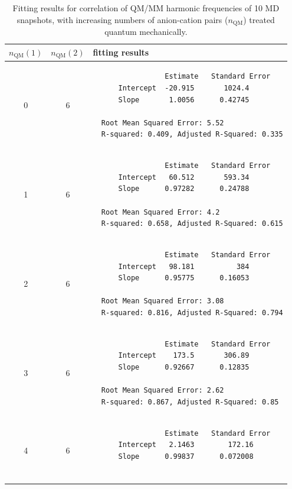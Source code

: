 \begin{table}
  \centering
  \caption[Fit procedure results for DVR convergence]{Fitting results for correlation of QM/MM harmonic frequencies of \num{10} MD snapshots, with increasing numbers of anion-cation pairs (\(n_{\text{QM}}\)) treated quantum mechanically.}
  \label{paper_02:tab:S6}
  \footnotesize
  \begin{tabular}{ccl}
    \toprule
    \(n_{\text{QM}}(1)\) & \(n_{\text{QM}}(2)\) & fitting results \\
    \midrule
    0 & 6 &
            \begin{minipage}{4.5in}
\begin{verbatim}
                 Estimate   Standard Error
      Intercept  -20.915       1024.4
      Slope       1.0056      0.42745

  Root Mean Squared Error: 5.52
  R-squared: 0.409, Adjusted R-Squared: 0.335
\end{verbatim}
            \end{minipage} \\
    1 & 6 &
            \begin{minipage}{4.5in}
\begin{verbatim}
                 Estimate   Standard Error
      Intercept   60.512       593.34
      Slope      0.97282      0.24788

  Root Mean Squared Error: 4.2
  R-squared: 0.658, Adjusted R-Squared: 0.615
\end{verbatim}
            \end{minipage} \\
    2 & 6 &
            \begin{minipage}{4.5in}
\begin{verbatim}
                 Estimate   Standard Error
      Intercept   98.181          384
      Slope      0.95775      0.16053

  Root Mean Squared Error: 3.08
  R-squared: 0.816, Adjusted R-Squared: 0.794
\end{verbatim}
            \end{minipage} \\
    3 & 6 &
            \begin{minipage}{4.5in}
\begin{verbatim}
                 Estimate   Standard Error
      Intercept    173.5       306.89
      Slope      0.92667      0.12835

  Root Mean Squared Error: 2.62
  R-squared: 0.867, Adjusted R-Squared: 0.85
\end{verbatim}
            \end{minipage} \\
    4 & 6 &
            \begin{minipage}{4.5in}
\begin{verbatim}
                 Estimate   Standard Error
      Intercept   2.1463        172.16
      Slope      0.99837      0.072008


\end{verbatim}
\end{minipage}
\end{tabular}
\end{table}
